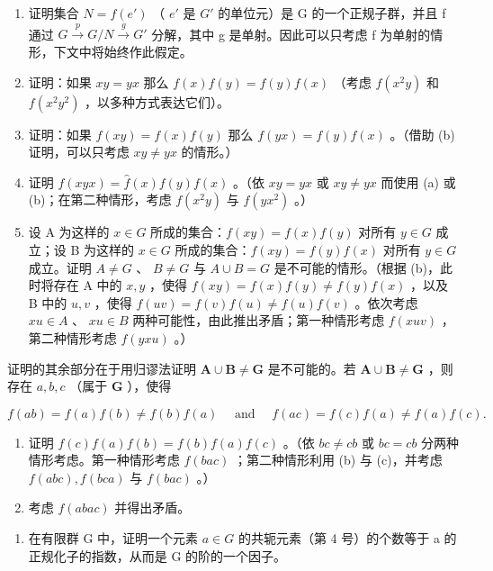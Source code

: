 \begin{enumerate}
\def\labelenumi{(\alph{enumi})}
\item
  证明集合 \(N = f(e')\) （ \(e'\) 是 \(G'\) 的单位元）是 G 的一个正规子群，并且 f 通过 \(G \xrightarrow{p} G/N \xrightarrow{g} G'\) 分解，其中 g 是单射。因此可以只考虑 f 为单射的情形，下文中将始终作此假定。
\item
  证明：如果 \(xy = yx\) 那么 \(f(x)f(y) = f(y)f(x)\) （考虑 \(f(x^2y)\) 和 \(f(x^2y^2)\) ，以多种方式表达它们）。
\item
  证明：如果 \(f(xy) = f(x)f(y)\) 那么 \(f(yx) = f(y)f(x)\) 。（借助 (b) 证明，可以只考虑 \(xy \neq yx\) 的情形。）
\item
  证明 \(f(xyx) = \hat{f}(x)f(y)f(x)\) 。（依 \(xy = yx\) 或 \(xy \neq yx\) 而使用 (a) 或 (b)；在第二种情形，考虑 \(f(x^2y)\) 与 \(f(yx^2)\) 。）
\item
  设 A 为这样的 \(x \in G\) 所成的集合：\(f(xy) = f(x)f(y)\) 对所有 \(y \in G\) 成立；设 B 为这样的 \(x \in G\) 所成的集合：\(f(xy) = f(y)f(x)\) 对所有 \(y \in G\) 成立。证明 \(A \neq G\) 、 \(B \neq G\) 与 \(A \cup B = G\) 是不可能的情形。（根据 (b)，此时将存在 A 中的 \(x, y\) ，使得 \(f(xy) = f(x)f(y) \neq f(y)f(x)\) ，以及 B 中的 \(u, v\) ，使得 \(f(uv) = f(v)f(u) \neq f(u)f(v)\) 。依次考虑 \(xu \in A\) 、 \(xu \in B\) 两种可能性，由此推出矛盾；第一种情形考虑 \(f(xuv)\) ，第二种情形考虑 \(f(yxu)\) 。）
\end{enumerate}

证明的其余部分在于用归谬法证明 \(\mathbf{A} \cup \mathbf{B} \neq \mathbf{G}\) 是不可能的。若 \(\mathbf{A} \cup \mathbf{B} \neq \mathbf{G}\) ，则存在 \(a, b, c\) （属于 \(\mathbf{G}\) ），使得

\[
f (a b) = f (a) f (b) \neq f (b) f (a) \quad \text { and } \quad f (a c) = f (c) f (a) \neq f (a) f (c).
\]

\begin{enumerate}
\def\labelenumi{(\alph{enumi})}
\setcounter{enumi}{5}
\item
  证明 \(f(c)f(a)f(b) = f(b)f(a)f(c)\) 。（依 \(bc \neq cb\) 或 \(bc = cb\) 分两种情形考虑。第一种情形考虑 \(f(bac)\) ；第二种情形利用 (b) 与 (c)，并考虑 \(f(abc), f(bca)\) 与 \(f(bac)\) 。）
\item
  考虑 \(f(abac)\) 并得出矛盾。
\end{enumerate}

\BourbakiExercisesSection

\begin{enumerate}
\def\labelenumi{\arabic{enumi}.}
\tightlist
\item
  在有限群 G 中，证明一个元素 \(a \in G\) 的共轭元素（第 4 号）的个数等于 a 的正规化子的指数，从而是 G 的阶的一个因子。
\end{enumerate}

